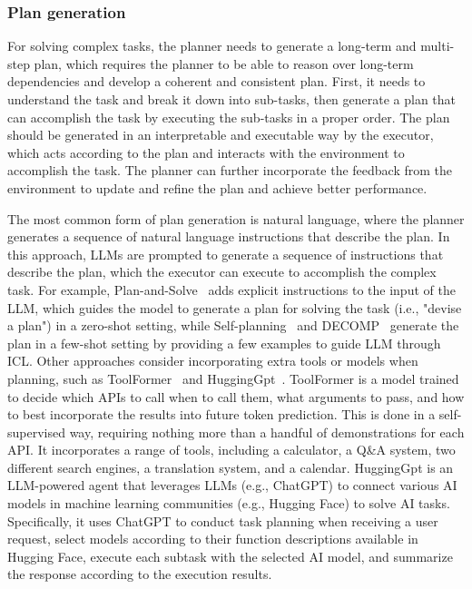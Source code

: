 \subsubsection{Plan generation}
\label{subsubsec:plan-generation}

For solving complex tasks, the planner needs to generate a long-term and multi-step plan, which requires the planner to be able to reason over long-term dependencies and develop a coherent and consistent plan.
First, it needs to understand the task and break it down into sub-tasks, then generate a plan that can accomplish the task by executing the sub-tasks in a proper order.
The plan should be generated in an interpretable and executable way by the executor, which acts according to the plan and interacts with the environment to accomplish the task.
The planner can further incorporate the feedback from the environment to update and refine the plan and achieve better performance.

The most common form of plan generation is natural language, where the planner generates a sequence of natural language instructions that describe the plan.
In this approach, LLMs are prompted to generate a sequence of instructions that describe the plan, which the executor can execute to accomplish the complex task.
For example, Plan-and-Solve~\cite{wang2023plan} adds explicit instructions to the input of the LLM, which guides the model to generate a plan for solving the task (i.e., "devise a plan") in a zero-shot setting, while Self-planning~\cite{jiang2024selfplanning} and DECOMP~\cite{khot2022decomposed} generate the plan in a few-shot setting by providing a few examples to guide LLM through ICL\@.
Other approaches consider incorporating extra tools or models when planning, such as ToolFormer~\cite{schick2023toolformer} and HuggingGpt~\cite{shen2023hugginggpt}.
ToolFormer is a model trained to decide which APIs to call when to call them, what arguments to pass, and how to best incorporate the results into future token prediction.
This is done in a self-supervised way, requiring nothing more than a handful of demonstrations for each API. It incorporates a range of tools, including a calculator, a Q\&A system, two different search engines, a translation system, and a calendar.
HuggingGpt is an LLM-powered agent that leverages LLMs (e.g., ChatGPT) to connect various AI models in machine learning communities (e.g., Hugging Face) to solve AI tasks.
Specifically, it uses ChatGPT to conduct task planning when receiving a user request, select models according to their function descriptions available in Hugging Face, execute each subtask with the selected AI model, and summarize the response according to the execution results.

